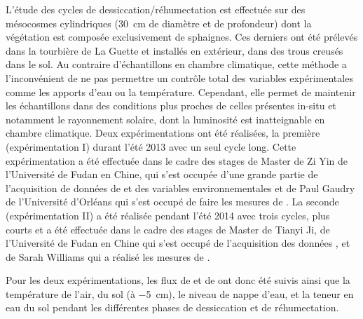 L'étude des cycles de dessiccation/réhumectation est effectuée sur des mésocosmes cylindriques (\SI{30}{\centi\metre} de diamètre et de profondeur) dont la végétation est composée exclusivement de sphaignes.
Ces derniers ont été prélevés dans la tourbière de La Guette et installés en extérieur, dans des trous creusés dans le sol.
Au contraire d'échantillons en chambre climatique, cette méthode a l'inconvénient de ne pas permettre un contrôle total des variables expérimentales comme les apports d'eau ou la température.
Cependant, elle permet de maintenir les échantillons dans des conditions plus proches de celles présentes in-situ et notamment le rayonnement solaire, dont la luminosité est inatteignable en chambre climatique.
Deux expérimentations ont été réalisées, la première (expérimentation I) durant l'été 2013 avec un seul cycle long.
Cette expérimentation a été effectuée dans le cadre des stages de Master de Zi Yin de l'Université de Fudan en Chine, qui s'est occupée d'une grande partie de l'acquisition de données de \coo et des variables environnementales et de Paul Gaudry de l'Université d'Orléans qui s'est occupé de faire les mesures de \chh.
La seconde (expérimentation II) a été réalisée pendant l'été 2014 avec trois cycles, plus courts et a été effectuée dans le cadre des stages de Master de Tianyi Ji, de l'Université de Fudan en Chine qui s'est occupé de l'acquisition des données \coo, et de Sarah Williams qui a réalisé les mesures de \chh. 

Pour les deux expérimentations, les flux de \coo et de \chh ont donc été suivis ainsi que la température de l'air, du sol (à \SI{-5}{\centi\metre}), le niveau de nappe d'eau, et la teneur en eau du sol pendant les différentes phases de dessiccation et de réhumectation. 

